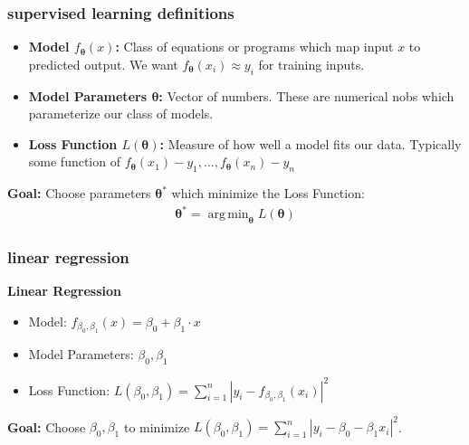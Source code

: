 \documentclass[handout,compress]{beamer}
\newcommand{\bs}[1]{\boldsymbol{#1}}
\DeclareMathOperator*{\argmin}{arg\,min}
\begin{document}
\begin{frame}
		\frametitle{supervised learning definitions}
		\small
		\begin{itemize}
			\item \textbf{\alert{Model} $f_{\bs{\theta}}(x)$:} Class of equations or programs which map input $x$ to predicted output. We want $f_{\bs{\theta}}(x_i) \approx y_i$ for training inputs. 
			\item \textbf{\alert{Model Parameters} $\bs{\theta}$:} Vector of numbers. These are numerical nobs which parameterize our class of models.
			\item \textbf{\alert{Loss Function} $L(\bs{\theta})$:} Measure of how well a model fits our data. Typically some function of $f_{\bs{\theta}}(x_1) - y_1, \ldots, f_{\bs{\theta}}(x_n) - y_n$
		\end{itemize}
		\begin{center}
			\textbf{Goal:} Choose parameters $\bs{\theta}^*$ which minimize the Loss Function:
			\begin{align*}
			 	\bs{\theta}^* = \argmin_{\bs{\theta}} L(\bs{\theta})
			\end{align*}
		\end{center}
\end{frame}


\begin{frame}
	\frametitle{linear regression}
			\begin{center}
				\textbf{Linear Regression}
			\end{center}
		
			\begin{itemize}
			\item Model: $f_{\beta_0,\beta_1}(x) = \beta_0 + \beta_1\cdot x$
			\vspace{2em}
			\item Model Parameters: $\beta_0, \beta_1$
			\vspace{2em}
			\item Loss Function: $L(\beta_0,\beta_1) = \sum_{i=1}^n |y_i - f_{\beta_0,\beta_1}(x_i)|^2$ 
			\vspace{2em}
			\end{itemize}

\begin{center}
	\textbf{Goal:} Choose $\beta_0,\beta_1$ to minimize $L(\beta_0,\beta_1) = \sum_{i=1}^n |y_i - \beta_0 - \beta_1x_i|^2$.
\end{center}
\end{frame}
\end{document}
